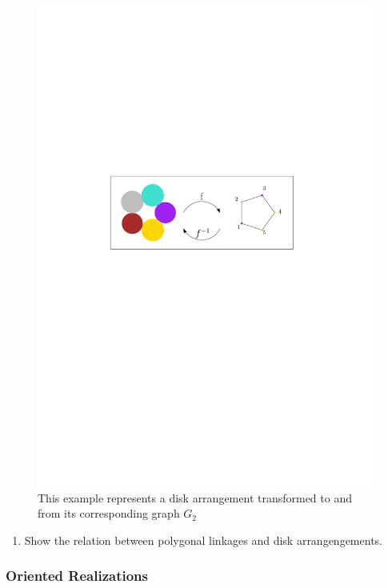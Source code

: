 \begin{figure}[h]
\begin{center}
\includegraphics[scale=1]{graphics/diskPackingTheoremExample.pdf}
\end{center} 
\caption{This example represents a disk arrangement transformed to and from its corresponding graph 
$G_2$}
\label{fig:DiskArrangement-1}
\end{figure}
\begin{enumerate}%
\item Show the relation between polygonal linkages and disk arrangengements.
\end{enumerate} 
\subsubsection{Oriented Realizations}
